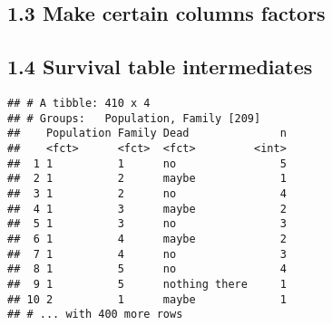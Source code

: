\documentclass[]{article}
\newenvironment{Shaded}{\begin{snugshade}}{\end{snugshade}}
\newcommand{\KeywordTok}[1]{\textcolor[rgb]{0.13,0.29,0.53}{\textbf{#1}}}
\newcommand{\StringTok}[1]{\textcolor[rgb]{0.31,0.60,0.02}{#1}}
\newcommand{\CommentTok}[1]{\textcolor[rgb]{0.56,0.35,0.01}{\textit{#1}}}
\newcommand{\OperatorTok}[1]{\textcolor[rgb]{0.81,0.36,0.00}{\textbf{#1}}}
\newcommand{\NormalTok}[1]{#1}
\begin{document}
\subsection{1.3 Make certain columns
factors}\label{make-certain-columns-factors}

\begin{Shaded}
\end{Shaded}

\subsection{1.4 Survival table
intermediates}\label{survival-table-intermediates}

\begin{Shaded}
\end{Shaded}

\begin{verbatim}
## # A tibble: 410 x 4
## # Groups:   Population, Family [209]
##    Population Family Dead              n
##    <fct>      <fct>  <fct>         <int>
##  1 1          1      no                5
##  2 1          2      maybe             1
##  3 1          2      no                4
##  4 1          3      maybe             2
##  5 1          3      no                3
##  6 1          4      maybe             2
##  7 1          4      no                3
##  8 1          5      no                4
##  9 1          5      nothing there     1
## 10 2          1      maybe             1
## # ... with 400 more rows
\end{verbatim}
\end{document}
